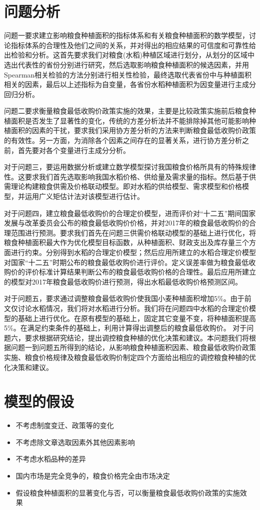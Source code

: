\documentclass[withoutpreface,bwprint]{cumcmthesis} %
\begin{document}
\section{问题分析}
问题一要求建立影响粮食种植面积的指标体系和有关粮食种植面积的数学模型，讨论指标体系的合理性及他们之间的关系，并对得出的相应结果的可信度和可靠性给出检验和分析。这首先要求我们对粮食(水稻)种植区域进行划分，从划分的区域中选出代表性的省份分别进行研究，然后选取影响粮食种植面积的候选因素，并用Spearman相关检验的方法分别进行相关性检验，最终选取代表省份中与种植面积相关的因素，最后以上述指标为自变量，各省份水稻种植面积为因变量进行主成分回归分析。\par
问题二要求衡量粮食最低收购价政策实施的效果，主要是比较政策实施前后粮食种植面积是否发生了显著性的变化，传统的方差分析法并不能排除掉其他可能影响种植面积的因素的干扰，要求我们采用协方差分析的方法来判断粮食最低收购价政策的有效性。另一方面，为消除各个因素之间存在的显著关系，进行协方差分析之前，首先要对各个变量进行主成分分析。\par
对于问题三，要运用数据分析或建立数学模型探讨我国粮食价格所具有的特殊规律性。这要求我们首先选取影响我国水稻价格、供给量及需求量的指标。然后基于供需理论构建粮食供需及价格联动模型。即对水稻的供给模型、需求模型和价格模型，并运用广义矩估计法对该模型进行估计。\par
对于问题四，建立粮食最低收购价的合理定价模型，进而评价对“十二五”期间国家发展与改革委员会公布的粮食最低收购价价格，并对2017年的粮食最低收购价的合理范围进行预测。要求我们首先在问题三供需价格联动模型的基础上进行优化，将粮食种植面积最大作为优化模型目标函数，从种植面积、财政支出及库存量三个方面进行约束。分别得到水稻的合理定价模型；然后应用所建立的水稻合理定价模型对国家“十二五”时期公布的粮食最低收购价进行评价。定义误差率做为粮食最低收购价的评价标准计算结果判断公布的粮食最低收购价格的合理性。最后应用所建立的模型对2017年粮食最低收购价进行预测，得出水稻最低收购价格预测区间。\par
对于问题五，要求通过调整粮食最低收购价使我国小麦种植面积增加$5\%$。由于前文仅讨论水稻情况，我们将对水稻进行分析。我们将在问题四中水稻的合理定价模型的基础上进行优化。在原有模型的基础上，固定其它变量不变，将种植面积提高5\%。在满足约束条件的基础上，利用计算得出调整后的粮食最低收购价。	
对于问题六，要求根据研究结论，提出调控粮食种植的优化决策和建议。本问题我们将根据问题一到问题五所得到的结论，从影响粮食种植面积因素、粮食最低收购价政策实施、粮食价格规律及粮食最低收购价制定四个方面给出相应的调控粮食种植的优化决策和建议。
	
	\section{模型的假设}
	\begin{itemize}
	\item 不考虑制度变迁、政策等的变化
	\item 不考虑除文章选取因素外其他因素影响
	\item 不考虑水稻品种的差异
	\item 国内市场是完全竞争的，粮食价格完全由市场决定
	\item 假设粮食种植面积的显著变化与否，可以衡量粮食最低收购价政策的实施效
	果
	\end{itemize}\par	
	
\end{document}
